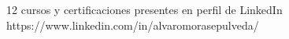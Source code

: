 \pagebreak
{}


\begin{cventries}

  \cventry
    {12 cursos y certificaciones presentes en perfil de LinkedIn \newline
    https://www.linkedin.com/in/alvaromorasepulveda/} %
    {} %
    {} %
    {} %
    {}

\end{cventries}
